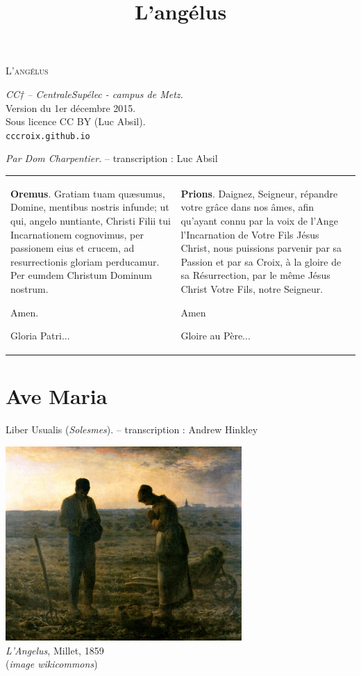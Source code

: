 \documentclass[11pt]{scrbook}
\title{L'angélus}
\author{}
\begin{document}
\begin{center}
\Huge \textsc{L'angélus}
\vspace{0.4cm}

\normalsize \small \emph{CC† -- CentraleSupélec - campus de Metz.} \\ \small Version du 1\textup{er} décembre 2015. \\ \small Sous licence CC BY (Luc Absil). \\\texttt{cccroix.github.io} 
\end{center}

\vspace{1cm}

{\flushright\emph{Par Dom Charpentier.} \small-- transcription : Luc Absil\\}

\vspace{1cm}

\begin{center}
{\small
\begin{tabular}{p{5cm} p{5cm}}
\textbf{Oremus}. Gratiam tuam quæsumus, Domine, mentibus nostris infunde; ut qui, angelo nuntiante, Christi Filii tui Incarnationem cognovimus, per passionem eius et crucem, ad resurrectionis gloriam perducamur. Per eumdem Christum Dominum nostrum. 

Amen.

Gloria Patri...
&
\textbf{Prions}. Daignez, Seigneur, répandre votre grâce dans nos âmes, afin qu'ayant connu par la voix de l'Ange l'Incarnation de Votre Fils Jésus Christ, nous puissions parvenir par sa Passion et par sa Croix, à la gloire de sa Résurrection, par le même Jésus Christ Votre Fils, notre Seigneur. 

Amen

Gloire au Père...
\end{tabular}
}
\end{center}

\newpage
\section*{Ave Maria}

\vspace{1cm}

{\flushright Liber Usualis (\emph{Solesmes}). \small-- transcription : Andrew Hinkley\\}


\begin{center}
\vspace{4cm}
\includegraphics[width=9cm]{Millet.jpg}
~\\
\emph{L'Angelus}, Millet, 1859\\ (\emph{{\small image wikicommons}})
\end{center}
\end{document}

